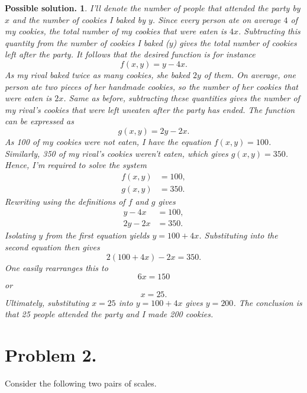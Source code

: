 \documentclass[a4paper,11pt]{article}
\newtheorem*{solution}{Possible solution.}
\begin{document}
\begin{solution}
 I'll denote the number of people that attended the party by $x$ and the number
 of cookies I baked by $y$. Since every person ate on average $4$ of my cookies,
 the total number of my cookies that were eaten is $4x$. Subtracting this
 quantity from the number of cookies I baked ($y$) gives the total number of
 cookies left after the party. It follows that the desired function is for
 instance
 \[
  f(x,y) = y - 4x.
 \]
 As my rival baked twice as many cookies, she baked $2y$ of them. On average,
 one person ate two pieces of her handmade cookies, so the number of her cookies
 that were eaten is $2x$. Same as before, subtracting these quantities gives the
 number of my rival's cookies that were left uneaten after the party has ended.
 The function can be expressed as
 \[
  g(x,y) = 2y - 2x.
 \]
 As 100 of my cookies were not eaten, I have the equation $f(x,y) = 100$.
 Similarly, 350 of my rival's cookies weren't eaten, which gives $g(x,y) = 350$.
 Hence, I'm required to solve the system
 \begin{align*}
  f(x,y)&= 100, \\
  g(x,y)&= 350.
 \end{align*}
 Rewriting using the definitions of $f$ and $g$ gives
 \begin{align*}
  y - 4x &= 100, \\
  2y - 2x &= 350.
 \end{align*}
 Isolating $y$ from the first equation yields $y = 100 + 4x$. Substituting into
 the second equation then gives
 \[
  2(100 + 4x) - 2x = 350.
 \]
 One easily rearranges this to
 \[
  6x = 150
 \]
 or
 \[
  x = 25.
 \]
 Ultimately, substituting $x = 25$ into $y = 100 + 4x$ gives $y = 200$. The
 conclusion is that 25 people attended the party and I made 200 cookies.
\end{solution}

\section*{Problem 2.}

Consider the following two pairs of scales.
\end{document}
